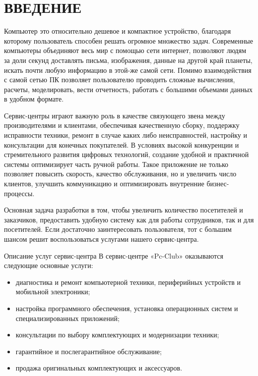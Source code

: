 \section*{ВВЕДЕНИЕ}

Компьютер это относительно дешевое и компактное устройство, благодаря которому пользователь способен решать огромное множество задач. Современные компьютеры объединяют весь мир с помощью сети интернет, позволяют людям за доли секунд доставлять письма, изображения, данные на другой край планеты, искать почти любую информацию в этой-же самой сети. Помимо взаимодействия с самой сетью ПК позволяет пользователю проводить сложные вычисления, расчеты, моделировать, вести отчетность, работать с большими объемами данных в удобном формате.

Сервис-центры играют важную роль в качестве связующего звена между производителями и клиентами, обеспечивая качественную сборку, поддержку исправности техники, ремонт в случае каких либо неисправностей, настройку и консультации для конечных покупателей. В условиях высокой конкуренции и стремительного развития цифровых технологий, создание удобной и практичной системы оптимизирует часть ручной работы. Такое приложение не только позволяет повысить скорость, качество обслуживания, но и увеличить число клиентов, улучшить коммуникацию и оптимизировать внутренние бизнес-процессы.

Основная задача разработки в том, чтобы увеличить количество посетителей и заказчиков, предоставить удобную систему как для работы сотрудников, так и для посетителей. Если достаточно заинтересовать пользователя, тот с большим шансом решит воспользоваться услугами нашего сервис-центра.

Описание услуг сервис-центра
В сервис-центре «Pc-Club» оказываются следующие основные услуги:
\begin{itemize}
\item диагностика и ремонт компьютерной техники, периферийных устройств и мобильной электроники;
\item настройка программного обеспечения, установка операционных систем и специализированных приложений;
\item консультации по выбору комплектующих и модернизации техники;
\item гарантийное и послегарантийное обслуживание;
\item продажа оригинальных комплектующих и аксессуаров.
\end{itemize}

